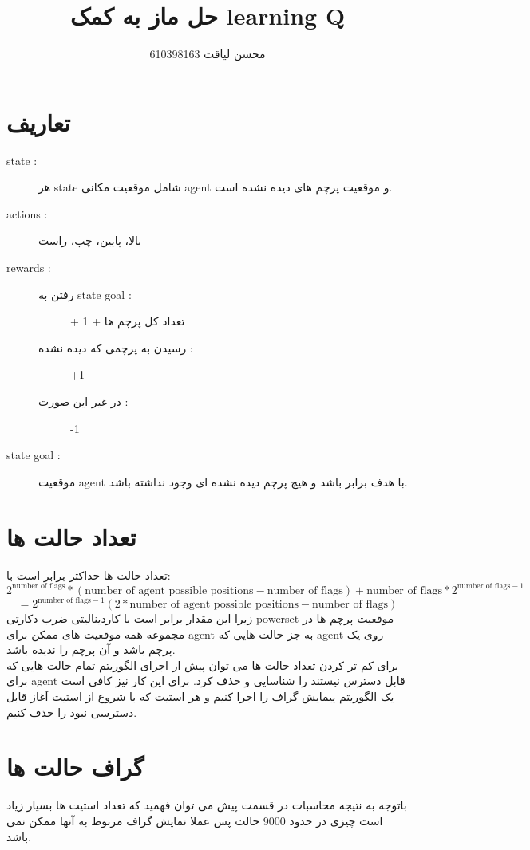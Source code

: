 \documentclass{article}
\title{حل ماز به کمک learning Q}
\author{محسن لیاقت 610398163}
\begin{document}
	\maketitle
	\tableofcontents
    
    \section{تعاریف}
        \begin{description}
        	\item[state : ] هر state شامل موقعیت مکانی agent و موقعیت پرچم های دیده نشده است.
        	\item[actions : ] بالا، پایین، چپ، راست
        	\item[rewards : ] \quad
        	    \begin{description}
        	    	\item[ رفتن به state goal : ] + تعداد کل پرچم ها + 1
        	    	\item[رسیدن به پرچمی که دیده نشده : ] +1
        	    	\item[در غیر این صورت : ] -1
        	    \end{description}
            \item[state goal : ] موقعیت agent با هدف برابر باشد و هیچ پرچم دیده نشده ای وجود نداشته باشد.
        \end{description}
	\section{تعداد حالت ها }
	    تعداد حالت ها حداکثر برابر است با:
	    \[ 
	    2^{\textrm{number of flags}} * (\textrm{number of agent possible positions} - \textrm{number of flags} ) + \textrm{number of flags} * 2^{\textrm{number of flags} - 1 }
	    \]
	    \[
	     =2^{\textrm{number of flags} - 1 } ( 2 * \textrm{number of agent possible positions} - \textrm{number of flags} )
	    \]
	    زیرا این مقدار برابر است با کاردینالیتی ضرب دکارتی powerset موقعیت پرچم ها در مجموعه همه موقعیت های ممکن برای agent به جز حالت هایی که agent روی یک پرچم باشد و آن پرچم را ندیده باشد.\\
	    برای کم تر کردن تعداد حالت ها می توان پیش از اجرای الگوریتم تمام حالت هایی که برای agent قابل دسترس نیستند را شناسایی و حذف کرد. برای این کار نیز کافی است یک الگوریتم پیمایش گراف را اجرا کنیم و هر استیت که با شروع از استیت آغاز قابل دسترسی نبود را حذف کنیم.
	    
	    \section{گراف حالت ها}
	        باتوجه به نتیجه محاسبات در قسمت پیش می توان فهمید که تعداد استیت ها بسیار زیاد است چیزی در حدود 9000 حالت پس عملا نمایش گراف مربوط به آنها ممکن نمی باشد.
\end{document}
